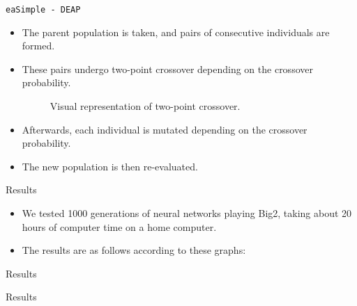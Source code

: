 \documentclass{beamer}
\begin{document}
\begin{frame}{\texttt{eaSimple - DEAP}}
	
	\begin{itemize}
		\item The parent population is taken, and pairs of consecutive individuals are formed.
		\item These pairs undergo two-point crossover depending on the crossover probability.
		\begin{figure}[h]
			
			\caption{Visual representation of two-point crossover.}
			\centering
		\end{figure}
		\item Afterwards, each individual is mutated depending on the crossover probability.
		\item The new population is then re-evaluated.
	\end{itemize}
	
\end{frame}
\begin{frame}{Results}
	
	\begin{itemize}
		\item We tested 1000 generations of neural networks playing Big2, taking about 20 hours of computer time on a home computer.
		\item The results are as follows according to these graphs:
	\end{itemize}
	
\end{frame}

\begin{frame}{Results}
\end{frame}

\begin{frame}{Results}
\end{frame}
\end{document}
